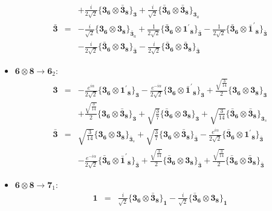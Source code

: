 \documentclass[english]{article}
\newcommand{\subcg}[3]{\big\{ {#1}\otimes{#2}\big\}^{}_{#3}}
\newcommand{\rep}[1]{\mathbf{#1}}
\begin{document}
\begin{itemize}
\begin{eqnarray*}
 & & +\frac{i}{2 \sqrt{2}}\subcg{\rep{3}_{\rep{6}}}{\rep{\bar{3}}_{\rep{8}}}{\rep{3}}+\frac{i}{\sqrt{2}}\subcg{\rep{\bar{3}}_{\rep{6}}}{\rep{\bar{3}}_{\rep{8}}}{\rep{3}_{a}}
\\
\rep{\bar{3}} &=& -\frac{i}{\sqrt{2}}\subcg{\rep{3}_{\rep{6}}}{\rep{3}_{\rep{8}}}{\rep{\bar{3}}_{a}}+\frac{1}{2 \sqrt{2}}\subcg{\rep{\bar{3}}_{\rep{6}}}{\rep{1^{\prime}}_{\rep{8}}}{\rep{\bar{3}}}-\frac{1}{2 \sqrt{2}}\subcg{\rep{\bar{3}}_{\rep{6}}}{\rep{\bar{1}^{\prime}}_{\rep{8}}}{\rep{\bar{3}}} \\ 
 & & -\frac{i}{2 \sqrt{2}}\subcg{\rep{\bar{3}}_{\rep{6}}}{\rep{3}_{\rep{8}}}{\rep{\bar{3}}}-\frac{i}{2 \sqrt{2}}\subcg{\rep{\bar{3}}_{\rep{6}}}{\rep{\bar{3}}_{\rep{8}}}{\rep{\bar{3}}}
\end{eqnarray*}
\item $\rep{6}\otimes\rep{8}\to\rep{6}_{2}$:
\begin{eqnarray*}
\rep{3} &=& -\frac{e^{i \alpha }}{2 \sqrt{2}}\subcg{\rep{3}_{\rep{6}}}{\rep{1^{\prime}}_{\rep{8}}}{\rep{3}}-\frac{e^{-i \alpha }}{2 \sqrt{2}}\subcg{\rep{3}_{\rep{6}}}{\rep{\bar{1}^{\prime}}_{\rep{8}}}{\rep{3}}+\frac{\sqrt{\frac{3}{14}}}{2}\subcg{\rep{3}_{\rep{6}}}{\rep{3}_{\rep{8}}}{\rep{3}} \\ 
 & & +\frac{\sqrt{\frac{3}{14}}}{2}\subcg{\rep{3}_{\rep{6}}}{\rep{\bar{3}}_{\rep{8}}}{\rep{3}}+\sqrt{\frac{3}{7}}\subcg{\rep{\bar{3}}_{\rep{6}}}{\rep{3}_{\rep{8}}}{\rep{3}}+\sqrt{\frac{3}{14}}\subcg{\rep{\bar{3}}_{\rep{6}}}{\rep{\bar{3}}_{\rep{8}}}{\rep{3}_{s}}
\\
\rep{\bar{3}} &=& \sqrt{\frac{3}{14}}\subcg{\rep{3}_{\rep{6}}}{\rep{3}_{\rep{8}}}{\rep{\bar{3}}_{s}}+\sqrt{\frac{3}{7}}\subcg{\rep{3}_{\rep{6}}}{\rep{\bar{3}}_{\rep{8}}}{\rep{\bar{3}}}-\frac{e^{i \alpha }}{2 \sqrt{2}}\subcg{\rep{\bar{3}}_{\rep{6}}}{\rep{1^{\prime}}_{\rep{8}}}{\rep{\bar{3}}} \\ 
 & & -\frac{e^{-i \alpha }}{2 \sqrt{2}}\subcg{\rep{\bar{3}}_{\rep{6}}}{\rep{\bar{1}^{\prime}}_{\rep{8}}}{\rep{\bar{3}}}+\frac{\sqrt{\frac{3}{14}}}{2}\subcg{\rep{\bar{3}}_{\rep{6}}}{\rep{3}_{\rep{8}}}{\rep{\bar{3}}}+\frac{\sqrt{\frac{3}{14}}}{2}\subcg{\rep{\bar{3}}_{\rep{6}}}{\rep{\bar{3}}_{\rep{8}}}{\rep{\bar{3}}}
\end{eqnarray*}
\item $\rep{6}\otimes\rep{8}\to\rep{7}_{1}$:
\begin{eqnarray*}
\rep{1} &=& \frac{i}{\sqrt{2}}\subcg{\rep{3}_{\rep{6}}}{\rep{\bar{3}}_{\rep{8}}}{\rep{1}}-\frac{i}{\sqrt{2}}\subcg{\rep{\bar{3}}_{\rep{6}}}{\rep{3}_{\rep{8}}}{\rep{1}}

\end{eqnarray*}
\end{itemize}
\end{document}
